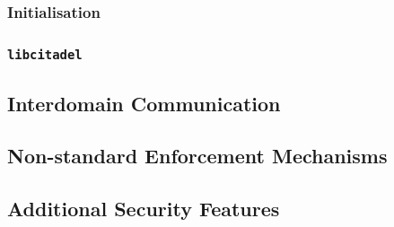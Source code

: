 \subsubsection{Initialisation}
\subsubsection{\texttt{libcitadel}}

\subsection{Interdomain Communication}
\label{sec:interdomain-comms}


\subsection{Non-standard Enforcement Mechanisms}

\subsection{Additional Security Features}
